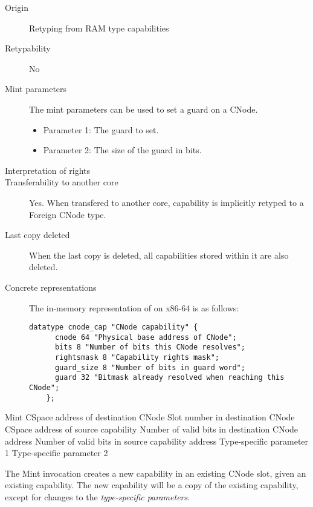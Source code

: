 \begin{description}
\item[Origin] Retyping from RAM type capabilities

\item[Retypability] No

\item[Mint parameters] The mint parameters can be used to set a guard
  on a CNode.
  \begin{itemize}
  \item Parameter 1: The guard to set.
  \item Parameter 2: The size of the guard in bits.
  \end{itemize}

\item[Interpretation of rights] 

\item[Transferability to another core] Yes.  When transfered to
  another core, capability is implicitly retyped to a Foreign CNode
  type. 

\item[Last copy deleted] When the last copy is deleted, all
  capabilities stored within it are also deleted.

\item[Concrete representations] The in-memory representation of on
  x86-64 is as follows:
    
  \begin{lstlisting}[language=Mackerel]
    datatype cnode_cap "CNode capability" {
      cnode 64 "Physical base address of CNode";
      bits 8 "Number of bits this CNode resolves";
      rightsmask 8 "Capability rights mask";
      guard_size 8 "Number of bits in guard word";
      guard 32 "Bitmask already resolved when reaching this CNode";
    };
    \end{lstlisting}
\end{description}

\begin{invocation}{Mint}\label{sec:mint}
  \arg CSpace address of destination CNode
  \arg Slot number in destination CNode
  \arg CSpace address of source capability
  \arg Number of valid bits in destination CNode address
  \arg Number of valid bits in source capability address
  \arg Type-specific parameter 1
  \arg Type-specific parameter 2
\end{invocation}
The Mint invocation creates a new capability in an existing CNode
slot, given an existing capability.  The new capability will be a copy
of the existing capability, except for changes to the
\emph{type-specific parameters}.


